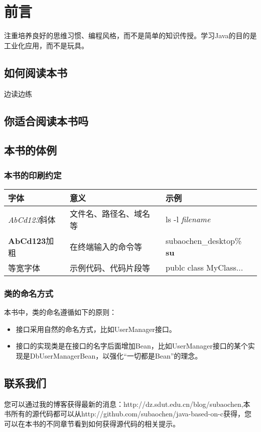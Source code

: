 \frontmatter
\chapter{前言}
注重培养良好的思维习惯、编程风格，而不是简单的知识传授。学习Java的目的是工业化应用，而不是玩具。

\section*{如何阅读本书}
边读边练

\section*{你适合阅读本书吗}
\section*{本书的体例}
\subsection*{本书的印刷约定}
\begin{tabular}{|l|l|l|}
    \hline
    字体 & 意义 & 示例 \\
    \hline
    \textsl{AbCd123}斜体 & 文件名、路径名、域名等 & ls -l \textsl{filename}\\
    \hline
    \textbf{AbCd123}加粗 & 在终端输入的命令等 & subaochen\_desktop\% \textbf{su} \\
    \hline
    等宽字体 & 示例代码、代码片段等 & publc class MyClass... \\
    \hline

\end{tabular}

\subsection*{类的命名方式}
本书中，类的命名遵循如下的原则：
\begin{itemize}
    \item 接口采用自然的命名方式，比如UserManager接口。
    \item 接口的实现类是在接口的名字后面增加Bean，比如UserManager接口的某个实现是DbUserManagerBean，以强化“一切都是Bean”的理念。
\end{itemize}
\section*{联系我们}
您可以通过我的博客获得最新的消息：http://dz.sdut.edu.cn/blog/subaochen,本书所有的源代码都可以从http://github.com/subaochen/java-based-on-c获得，您可以在本书的不同章节看到如何获得源代码的相关提示。

